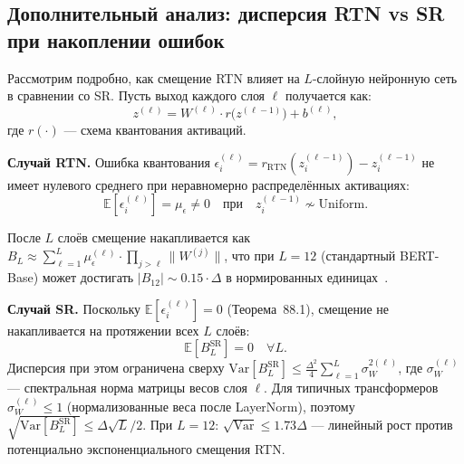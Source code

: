 

\subsection{Дополнительный анализ: дисперсия RTN vs SR при накоплении ошибок}
\label{ssec:glava88-rtn-vs-sr-var}

Рассмотрим подробно, как смещение RTN влияет на $L$-слойную
нейронную сеть в сравнении со SR.  Пусть выход каждого слоя
$\ell$ получается как:
\[
  z^{(\ell)} = W^{(\ell)} \cdot r\bigl(z^{(\ell-1)}\bigr) + b^{(\ell)},
\]
где $r(\cdot)$ — схема квантования активаций.

\textbf{Случай RTN.}
Ошибка квантования $\epsilon_i^{(\ell)} = r_{\mathrm{RTN}}(z_i^{(\ell-1)}) - z_i^{(\ell-1)}$
не имеет нулевого среднего при неравномерно распределённых активациях:
\[
  \mathbb{E}[\epsilon_i^{(\ell)}] = \mu_\epsilon \neq 0
  \quad \text{при} \quad z_i^{(\ell-1)} \not\sim \mathrm{Uniform}.
\]

После $L$ слоёв смещение накапливается как
$B_L \approx \sum_{\ell=1}^L \mu_\epsilon^{(\ell)} \cdot \prod_{j>\ell} \|W^{(j)}\|$,
что при $L = 12$ (стандартный BERT-Base) может достигать
$|B_{12}| \sim 0{.}15 \cdot \Delta$ в нормированных единицах~\cite{hubara2018}.

\textbf{Случай SR.}
Поскольку $\mathbb{E}[\epsilon_i^{(\ell)}] = 0$ (Теорема~88.1),
смещение не накапливается на протяжении всех $L$ слоёв:
\[
  \mathbb{E}[B_L^{\mathrm{SR}}] = 0 \quad \forall L.
\]
Дисперсия при этом ограничена сверху
$\mathrm{Var}[B_L^{\mathrm{SR}}] \leq \frac{\Delta^2}{4} \sum_{\ell=1}^L \sigma_W^{2(\ell)}$,
где $\sigma_W^{(\ell)}$ — спектральная норма матрицы весов слоя $\ell$.
Для типичных трансформеров $\sigma_W^{(\ell)} \leq 1$
(нормализованные веса после LayerNorm), поэтому
$\sqrt{\mathrm{Var}[B_L^{\mathrm{SR}}]} \leq \Delta\sqrt{L}/2$.
При $L = 12$: $\sqrt{\mathrm{Var}} \leq 1{.}73\Delta$ — линейный рост
против потенциально экспоненциального смещения RTN.

